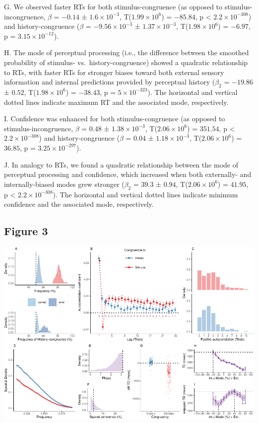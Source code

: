 \documentclass[
]{article}
\begin{document}
G. We observed faster RTs for both stimulus-congruence (as opposed to
stimulus-incongruence, \(\beta\) = \(-0.14\) ±
\(\ensuremath{1.6\times 10^{-3}}\),
T(\(\ensuremath{1.99\times 10^{6}}\)) = \(-85.84\), p < \(\ensuremath{2.2\times 10^{-308}}\)) and
history-congruence (\(\beta\) = \(\ensuremath{-9.56\times 10^{-3}}\) ±
\(\ensuremath{1.37\times 10^{-3}}\),
T(\(\ensuremath{1.98\times 10^{6}}\)) = \(-6.97\), p =
\(\ensuremath{3.15\times 10^{-12}}\)).

H. The mode of perceptual processing (i.e., the difference between the
smoothed probability of stimulus- vs.~history-congruence) showed a
quadratic relationship to RTs, with faster RTs for stronger biases
toward both external sensory information and internal predictions
provided by perceptual history (\(\beta_2\) = \(-19.86\) ± \(0.52\),
T(\(\ensuremath{1.98\times 10^{6}}\)) = \(-38.43\), p =
\(\ensuremath{5\times 10^{-323}}\)). The horizontal and vertical dotted
lines indicate maximum RT and the associated mode, respectively.

I. Confidence was enhanced for both stimulus-congruence (as opposed to
stimulus-incongruence, \(\beta\) = \(0.48\) ±
\(\ensuremath{1.38\times 10^{-3}}\),
T(\(\ensuremath{2.06\times 10^{6}}\)) = \(351.54\), p < \(\ensuremath{2.2\times 10^{-308}}\)) and
history-congruence (\(\beta\) = \(0.04\) ±
\(\ensuremath{1.18\times 10^{-3}}\),
T(\(\ensuremath{2.06\times 10^{6}}\)) = \(36.85\), p =
\(\ensuremath{3.25\times 10^{-297}}\)).

J. In analogy to RTs, we found a quadratic relationship between the mode
of perceptual processing and confidence, which increased when both
externally- and internally-biased modes grew stronger (\(\beta_2\) =
\(39.3\) ± \(0.94\), T(\(\ensuremath{2.06\times 10^{6}}\)) = \(41.95\),
p < \(\ensuremath{2.2\times 10^{-308}}\)). The horizontal and vertical dotted lines indicate minimum
confidence and the associated mode, respectively.

\newpage

\hypertarget{figure-3}{%
\subsection{Figure 3}\label{figure-3}}

\includegraphics{modes_mouse_rev1b_files/figure-latex/Figure_3-1.pdf}
\end{document}
